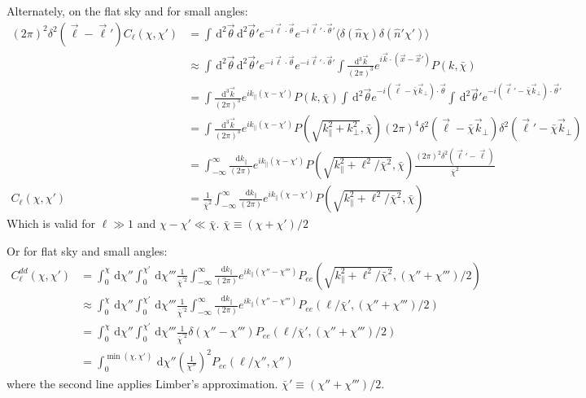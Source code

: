 \documentclass[onecolumn,prd,nofootinbib]{revtex4-1}
\newcommand{\ud}{\,\mathrm{d}}
\begin{document}
Alternately, on the flat sky and for small angles:
\begin{align}
(2\pi)^2\delta^2(\vec \ell - \vec \ell')C_\ell(\chi, \chi')
    &=
        \int\ud^2\vec\theta\ud^2\vec\theta'
        e^{-i\vec\ell\cdot\vec\theta} e^{-i\vec\ell'\cdot\vec\theta'}
        \langle \delta(\hat n \chi) \delta(\hat n' \chi') \rangle
        \\
    &\approx
        \int\ud^2\vec\theta\ud^2\vec\theta'
        e^{-i\vec\ell\cdot\vec\theta} e^{-i\vec\ell'\cdot\vec\theta'}
        \int\frac{\ud^3\vec k}{(2 \pi)^3} 
        e^{i\vec k \cdot (\vec x - \vec x')} P(k, \bar\chi)
        \\
    &=
        \int\frac{\ud^3\vec k}{(2 \pi)^3} 
        e^{i k_\parallel (\chi - \chi')} P(k, \bar\chi)
        \int\ud^2\vec\theta e^{-i(\vec\ell-\bar\chi\vec k_\bot)\cdot\vec\theta}
        \int\ud^2\vec\theta' e^{-i(\vec\ell'-\bar\chi\vec k_\bot)\cdot\vec\theta'}
        \\
    &=
        \int\frac{\ud^3\vec k}{(2 \pi)^3} 
        e^{i k_\parallel (\chi - \chi')} P(\sqrt{k_\parallel^2 + k_\bot^2}, \bar\chi)
        (2\pi)^4 \delta^2(\vec\ell - \bar\chi \vec k_\bot)
        \delta^2(\vec\ell' - \bar\chi\vec k_\bot)
        \\
    &=
        \int_{-\infty}^\infty\frac{\ud k_\parallel}{(2 \pi)} 
        e^{i k_\parallel (\chi - \chi')}
        P(\sqrt{k_\parallel^2 + \ell^2/\bar\chi^2}, \bar\chi)
        \frac{(2\pi)^2\delta^2(\vec\ell' - \vec \ell)}{\bar\chi^2}
        \\
C_\ell(\chi, \chi')
    &= \frac{1}{\bar\chi^2}
        \int_{-\infty}^\infty\frac{\ud k_\parallel}{(2 \pi)} 
        e^{i k_\parallel (\chi - \chi')}
        P(\sqrt{k_\parallel^2 + \ell^2/\bar\chi^2}, \bar\chi)
\end{align}
Which is valid for $\ell \gg 1$ and $\chi - \chi' \ll \bar\chi$.
$\bar \chi \equiv (\chi + \chi') /2$


Or for flat sky and small angles:
\begin{align}
C^{dd}_\ell(\chi,\chi') 
    &=
    \int_0^\chi\ud\chi''
    \int_0^{\chi'}\ud\chi'''
    \frac{1}{\bar\chi^{\prime 2}}
    \int_{-\infty}^\infty\frac{\ud k_\parallel}{(2 \pi)} 
    e^{i k_\parallel (\chi'' - \chi''')}
    P_{ee}(\sqrt{k_\parallel^2 + \ell^2/\bar\chi^2}, (\chi'' + \chi''')/2)
    \\
    &\approx
    \int_0^\chi\ud\chi''
    \int_0^{\chi'}\ud\chi'''
    \frac{1}{\bar\chi^{\prime 2}}
    \int_{-\infty}^\infty\frac{\ud k_\parallel}{(2 \pi)} 
    e^{i k_\parallel (\chi'' - \chi''')}
    P_{ee}(\ell/\bar\chi', (\chi'' + \chi''')/2)
    \\
    &=
    \int_0^\chi\ud\chi''
    \int_0^{\chi'}\ud\chi'''
    \frac{1}{\bar\chi^{\prime 2}}
    \delta(\chi'' - \chi''')
    P_{ee}(\ell/\bar\chi', (\chi'' + \chi''')/2)
    \\
    &=
    \int_0^{\min(\chi,\chi')}\ud\chi''
    \left(\frac{1}{\chi''}\right)^2
    P_{ee}(\ell/\chi'', \chi'')
\end{align}
where the second line applies Limber's approximation. 
$\bar\chi' \equiv (\chi'' + \chi''')/2$.
\end{document}
